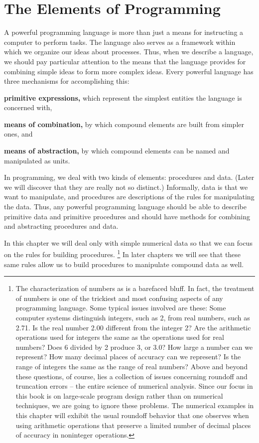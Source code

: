 
\section[sec:elements-of-programming]{The Elements of Programming}

A powerful programming language is more than just a means for instructing a computer to perform tasks.
The language also serves as a framework within which we organize our ideas about processes.
Thus, when we describe a language,
we should pay particular attention to the means
that the language provides for combining simple ideas to form more complex ideas.
Every powerful language has three mechanisms for accomplishing this:
\item {\bf primitive expressions,} which represent the simplest entities the language is concerned with,
\item {\bf means of combination,} by which compound elements are built from simpler ones, and
\item {\bf means of abstraction,} by which compound elements can be named and manipulated as units.
\stopitemize

In programming, we deal with two kinds of elements:
procedures and data.
(Later we will discover that they are really not so distinct.)
Informally, data is  that we want to manipulate,
and procedures are descriptions of the rules for manipulating the data.
Thus, any powerful programming language should be able to describe primitive data and primitive procedures
and should have methods for combining and abstracting procedures and data.

In this chapter we will deal only with simple numerical data
so that we can focus on the rules for building procedures.
\footnote{%
   The characterization of numbers as  is a barefaced bluff.
   In fact, the treatment of numbers is one of the trickiest and most confusing aspects of any programming language.
   Some typical issues involved are these:
   Some computer systems distinguish integers, such as 2, from real numbers, such as 2.71.
   Is the real number 2.00 different from the integer 2?
   Are the arithmetic operations used for integers the same as the operations used for real numbers?
   Does 6 divided by 2 produce 3, or 3.0?
   How large a number can we represent?
   How many decimal places of accuracy can we represent?
   Is the range of integers the same as the range of real numbers?
   Above and beyond these questions,
   of course, lies a collection of issues concerning roundoff and truncation errors
   -- the entire science of numerical analysis.
   Since our focus in this book is on large-scale program design rather than on numerical techniques,
   we are going to ignore these problems.
   The numerical examples in this chapter will exhibit the usual roundoff behavior that one observes
   when using arithmetic operations
   that preserve a limited number of decimal places of accuracy in noninteger operations.
}
In later chapters we will see that these same rules allow us to build procedures to manipulate compound data as well.

